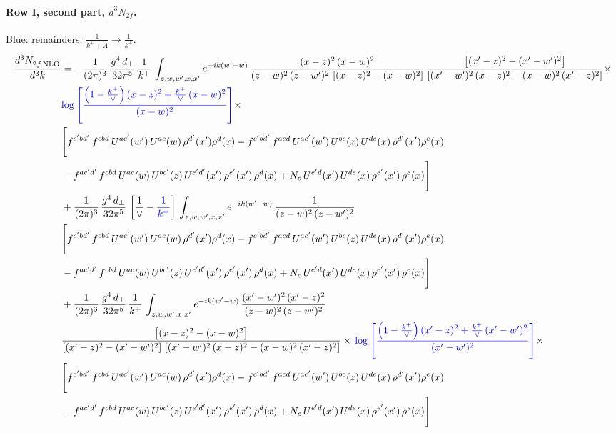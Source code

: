 \documentclass[10pt]{article}
\numberwithin{equation}{section}
\newcommand{\new}[1]{{\color{blue}#1}}
\begin{document}
\paragraph{Row I, second part, $d^3N_{2f}$.}
\new{Blue}: remainders; $\frac{1}{k^++\Lambda}\to\frac{1}{k^+}$.
\begin{align}
    \frac{d^{3}N_{2f\,\rm NLO}^{\rm}}{d^{3}k}  & =   - \frac{1}{(2\pi)^{3}}\, \frac{g^{4}\,d_{\perp}}{32\pi^{5}}\,\frac{1}{k^{+}}\,\int_{z,w,w^{\prime},x,x'} e^{-ik(w^{\prime}-w)}\,\frac{(x-z)^{2}\, (x-w)^{2}}{(z-w)^{2}\, (z-w')^{2}\,\left[(x-z)^{2} - (x-w)^{2}\right]}\,\frac{\left[(x'-z)^{2}-(x'-w')^{2}\right]}{\left[(x'-w')^{2}\, (x-z)^{2} - (x-w)^{2}\, (x'-z)^{2}\right]}\times\notag \\ & \new{\log{\left[\frac{\left(1-\frac{k^{+}}{\vee}\right)(x-z)^{2}+\frac{k^{+}}{\vee}\,(x-w)^{2}}{(x-w)^{2}}\right]}}\times\notag \\ & \Bigg[f^{c'bd'}\,f^{cbd}\, U^{ac'}(w')\,U^{ac}(w)\,\rho^{d'}(x')\rho^{d}(x)- f^{c'bd'}\,f^{acd}\,U^{ac'}(w')\,U^{bc}(z)\,U^{de}(x)\,\rho^{d'}(x')\rho^{e}(x) \notag \\ & -f^{ac'd'}\,f^{cbd}\,U^{ac}(w)\,U^{bc'}(z)\,U^{e'd'}(x')\,\rho^{e'}(x')\,\rho^{d}(x) +N_{c}\,U^{e'd}(x')\,U^{de}(x)\,\rho^{e'}(x')\,\rho^{e}(x)\Bigg]  \notag \\
& + \frac{1}{(2\pi)^{3}}\, \frac{g^{4}\,d_{\perp}}{32\pi^{5}}\,\left[\frac{1}{\vee} - \new{\frac{1}{k^{+}}}\right]\,\int_{z,w,w^{\prime},x,x'} e^{-ik(w^{\prime}-w)}\,\frac{1}{(z-w)^{2}\, (z-w')^{2}}\notag \\ & \Bigg[f^{c'bd'}\,f^{cbd}\, U^{ac'}(w')\,U^{ac}(w)\,\rho^{d'}(x')\rho^{d}(x)- f^{c'bd'}\,f^{acd}\,U^{ac'}(w')\,U^{bc}(z)\,U^{de}(x)\,\rho^{d'}(x')\rho^{e}(x) \notag \\ & -f^{ac'd'}\,f^{cbd}\,U^{ac}(w)\,U^{bc'}(z)\,U^{e'd'}(x')\,\rho^{e'}(x')\,\rho^{d}(x) +N_{c}\,U^{e'd}(x')\,U^{de}(x)\,\rho^{e'}(x')\,\rho^{e}(x)\Bigg]  \notag \\
& + \frac{1}{(2\pi)^{3}}\, \frac{g^{4}\,d_{\perp}}{32\pi^{5}}\,\frac{1}{k^{+}}\,\int_{z,w,w^{\prime},x,x'} e^{-ik(w^{\prime}-w)}\,\frac{(x'-w')^{2}\, (x'-z)^{2}}{(z-w)^{2}\, (z-w')^{2}}\notag \\ & \frac{\left[(x-z)^{2} - (x-w)^{2}\right]}{\left[(x'-z)^{2} - (x'-w')^{2}\right]\, \left[(x'-w')^{2}\, (x - z)^{2} - (x-w)^{2}\,(x'-z)^{2}\right]}\times\, \new{\log{\left[\frac{\left(1-\frac{k^{+}}{\vee}\right)(x'-z)^{2}+\frac{k^{+}}{\vee}\,(x'-w')^{2}}{(x'-w')^{2}}\right]}}\times \notag \\ &  \Bigg[f^{c'bd'}\,f^{cbd}\, U^{ac'}(w')\,U^{ac}(w)\,\rho^{d'}(x')\rho^{d}(x)- f^{c'bd'}\,f^{acd}\,U^{ac'}(w')\,U^{bc}(z)\,U^{de}(x)\,\rho^{d'}(x')\rho^{e}(x) \notag \\ & -f^{ac'd'}\,f^{cbd}\,U^{ac}(w)\,U^{bc'}(z)\,U^{e'd'}(x')\,\rho^{e'}(x')\,\rho^{d}(x) +N_{c}\,U^{e'd}(x')\,U^{de}(x)\,\rho^{e'}(x')\,\rho^{e}(x)\Bigg] \label{eq:F:G2I2f}
\end{align}
\end{document}
